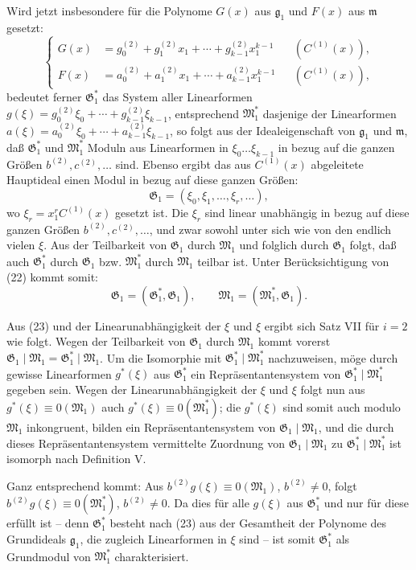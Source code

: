 \documentclass[11pt]{article}
\providecommand{\Gmod}{\mathfrak G}
\providecommand{\Mmod}{\mathfrak M}
\providecommand{\mideal}{\mathfrak m}
\providecommand{\gideal}{\mathfrak g}
\begin{document}
Wird jetzt insbesondere für die Polynome $G(x)$ aus $\gideal_1$ und $F(x)$ aus $\mideal$ gesetzt:
\begin{equation}
 \left\{\begin{aligned}
  G(x)&=g^{(2)}_0+g^{(2)}_1x_1+\cdots+g^{(2)}_{k-1}x_1^{k-1} &&(C^{(1)}(x)),\\
  F(x)&=a^{(2)}_0+a^{(2)}_1x_1+\cdots+a^{(2)}_{k-1}x_1^{k-1} &&(C^{(1)}(x)),
 \end{aligned}\right.
\tag{22}
\end{equation}
bedeutet ferner $\Gmod^*_1$ das System aller Linearformen $g(\xi)=g^{(2)}_0\xi_0+\cdots+g^{(2)}_{k-1}\xi_{k-1}$, entsprechend $\Mmod^*_1$ dasjenige der Linearformen $a(\xi)=a^{(2)}_0\xi_0+\cdots+a^{(2)}_{k-1}\xi_{k-1}$, so folgt aus der Idealeigenschaft von $\gideal_1$ und $\mideal$, daß $\Gmod^*_1$ und $\Mmod^*_1$ Moduln aus Linearformen in $\xi_0\ldots\xi_{k-1}$ in bezug auf die ganzen Größen $b^{(2)}, c^{(2)},\ldots$ sind. Ebenso ergibt das aus $C^{(1)}(x)$ abgeleitete Hauptideal einen Modul in bezug auf diese ganzen Größen:
\[
 \Gmod_1=(\xi_0,\xi_1,\ldots,\xi_r,\ldots),
\]
wo $\xi_r=x_1^rC^{(1)}(x)$ gesetzt ist. Die $\xi_r$ sind linear unabhängig in bezug auf diese ganzen Größen $b^{(2)}, c^{(2)},\ldots$, und zwar sowohl unter sich wie von den endlich vielen $\xi$. Aus der Teilbarkeit von $\Gmod_1$ durch $\Mmod_1$ und folglich durch $\Gmod_1$ folgt, daß auch $\Gmod^*_1$ durch $\Gmod_1$ bzw. $\Mmod^*_1$ durch $\Mmod_1$ teilbar ist. Unter Berücksichtigung von (22) kommt somit:
\begin{equation}
 \Gmod_1=(\Gmod^*_1,\Gmod_1),\qquad
 \Mmod_1=(\Mmod^*_1,\Gmod_1).
\tag{23}
\end{equation}

Aus (23) und der Linearunabhängigkeit der $\xi$ und $\xi$ ergibt sich Satz VII für $i=2$ wie folgt. Wegen der Teilbarkeit von $\Gmod_1$ durch $\Mmod_1$ kommt vorerst $\Gmod_1\mid\Mmod_1=\Gmod^*_1\mid\Mmod_1$. Um die Isomorphie mit $\Gmod^*_1\mid\Mmod^*_1$ nachzuweisen, möge durch gewisse Linearformen $g^*(\xi)$ aus $\Gmod^*_1$ ein Repräsentantensystem von $\Gmod^*_1\mid\Mmod^*_1$ gegeben sein. Wegen der Linearunabhängigkeit der $\xi$ und $\xi$ folgt nun aus $g^*(\xi)\equiv 0(\Mmod_1)$ auch $g^*(\xi)\equiv 0(\Mmod^*_1)$; die $g^*(\xi)$ sind somit auch modulo $\Mmod_1$ inkongruent, bilden ein Repräsentantensystem von $\Gmod_1\mid\Mmod_1$, und die durch dieses Repräsentantensystem vermittelte Zuordnung von $\Gmod_1\mid\Mmod_1$ zu $\Gmod^*_1\mid\Mmod^*_1$ ist isomorph nach Definition V.

Ganz entsprechend kommt: Aus $b^{(2)}g(\xi)\equiv0(\Mmod_1)$, $b^{(2)}\ne0$, folgt $b^{(2)}g(\xi)\equiv0(\Mmod^*_1)$, $b^{(2)}\ne0$. Da dies für alle $g(\xi)$ aus $\Gmod^*_1$ und nur für diese erfüllt ist -- denn $\Gmod^*_1$ besteht nach (23) aus der Gesamtheit der Polynome des Grundideals $\gideal_1$, die zugleich Linearformen in $\xi$ sind -- ist somit $\Gmod^*_1$ als Grundmodul von $\Mmod^*_1$ charakterisiert.
\end{document}
